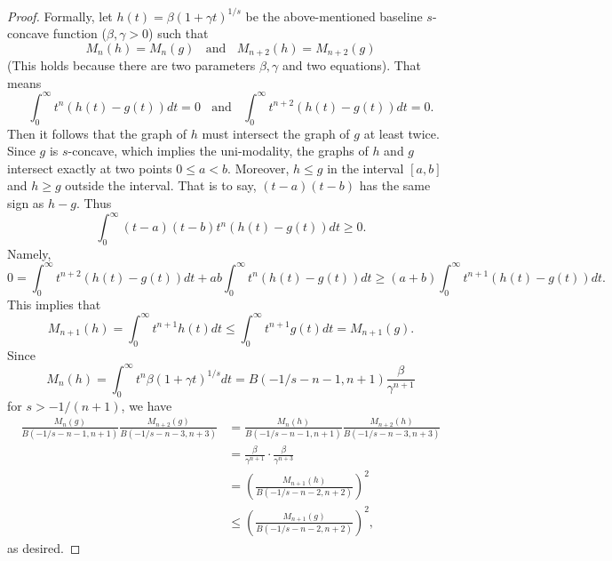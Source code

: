 \documentclass[11pt]{article}
\begin{document}
{{{{\begin{proof}
Formally, let $h(t)=\beta(1+\gamma t)^{1/s}$ be the above-mentioned baseline $s$-concave function ($\beta,\gamma>0$) such that
\begin{equation*}
M_n(h)=M_n(g)\ \ \ \ \mbox{and}\ \ \ \ M_{n+2}(h)=M_{n+2}(g)
\end{equation*}
(This holds because there are two parameters $\beta,\gamma$ and two equations). That means
\begin{equation*}
\int_0^\infty t^n(h(t)-g(t))dt=0\ \ \ \ \mbox{and}\ \ \ \ \int_0^\infty t^{n+2}(h(t)-g(t))dt=0.
\end{equation*}
Then it follows that the graph of $h$ must intersect the graph of $g$ at least twice. Since $g$ is $s$-concave, which implies the uni-modality, the graphs of $h$ and $g$ intersect exactly at two points $0\le a<b$. Moreover, $h\le g$ in the interval $[a,b]$ and $h\ge g$ outside the interval. That is to say, $(t-a)(t-b)$ has the same sign as $h-g$. Thus
\begin{equation*}
\int_0^{\infty} (t-a)(t-b)t^n(h(t)-g(t))dt\ge 0.
\end{equation*}
Namely,
\begin{equation*}
0=\int_0^{\infty}t^{n+2}(h(t)-g(t))dt+ab\int_0^{\infty}t^n(h(t)-g(t))dt\ge (a+b)\int_0^\infty t^{n+1}(h(t)-g(t))dt.
\end{equation*}
This implies that
\begin{equation*}
M_{n+1}(h)=\int_0^{\infty}t^{n+1}h(t)dt\le\int_0^\infty t^{n+1}g(t)dt=M_{n+1}(g).
\end{equation*}
Since
\begin{equation*}
\label{equ: integral}
M_n(h)=\int_0^\infty t^n\beta(1+\gamma t)^{1/s}dt=B(-1/s-n-1,n+1)\frac{\beta}{\gamma^{n+1}}
\end{equation*}
for $s>-1/(n+1)$, we have
\begin{equation*}
\begin{split}
\frac{M_n(g)}{B(-1/s-n-1,n+1)}\frac{M_{n+2}(g)}{B(-1/s-n-3,n+3)}&=\frac{M_n(h)}{B(-1/s-n-1,n+1)}\frac{M_{n+2}(h)}{B(-1/s-n-3,n+3)}\\
&=\frac{\beta}{\gamma^{n+1}}\cdot \frac{\beta}{\gamma^{n+3}}\\
&=\left(\frac{M_{n+1}(h)}{B(-1/s-n-2,n+2)}\right)^2\\
&\le \left(\frac{M_{n+1}(g)}{B(-1/s-n-2,n+2)}\right)^2,
\end{split}
\end{equation*}
as desired.


\end{proof}}}}}
\end{document}
